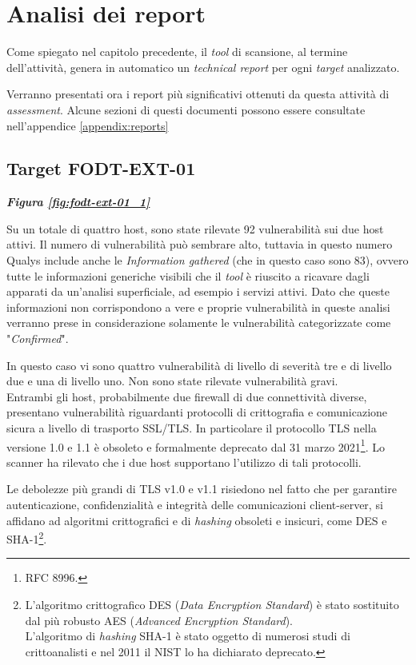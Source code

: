 \documentclass[target=bach,aauheader=]{thud}
\begin{document}
\pagebreak

\section{Analisi dei report}
Come spiegato nel capitolo precedente, il \textit{tool} di scansione, al termine dell'attività, genera in automatico un \textit{technical report} per ogni \textit{target} analizzato.

Verranno presentati ora i report più significativi ottenuti da questa attività di \textit{assessment}.\newline
Alcune sezioni di questi documenti possono essere consultate nell'appendice \ref{appendix:reports}

\subsection{Target FODT-EXT-01} \textbf{\textit{Figura \ref{fig:fodt-ext-01_1}}}

Su un totale di quattro host, sono state rilevate 92 vulnerabilità sui due host attivi. Il numero di vulnerabilità può sembrare alto, tuttavia in questo numero Qualys include anche le \textit{Information gathered} (che in questo caso sono 83), ovvero tutte le informazioni generiche visibili che il \textit{tool} è riuscito a ricavare dagli apparati da un'analisi superficiale, ad esempio i servizi attivi. Dato che queste informazioni non corrispondono a vere e proprie vulnerabilità in queste analisi verranno prese in considerazione solamente le vulnerabilità categorizzate come "\textit{Confirmed}".

In questo caso vi sono quattro vulnerabilità di livello di severità tre e di livello due e una di livello uno. Non sono state rilevate vulnerabilità gravi.
\\ Entrambi gli host, probabilmente due firewall di due connettività diverse, presentano vulnerabilità riguardanti protocolli di crittografia e comunicazione sicura a livello di trasporto SSL/TLS. In particolare il protocollo TLS nella versione 1.0 e 1.1 è obsoleto e formalmente deprecato dal 31 marzo 2021\footnote{RFC 8996.}. Lo scanner ha rilevato che i due host supportano l'utilizzo di tali protocolli.

Le debolezze più grandi di TLS v1.0 e v1.1 risiedono nel fatto che per garantire autenticazione, confidenzialità e integrità delle comunicazioni client-server, si affidano ad algoritmi crittografici e di \textit{hashing} obsoleti e insicuri, come DES e SHA-1\footnote{L'algoritmo crittografico DES (\textit{Data Encryption Standard}) è stato sostituito dal più robusto AES (\textit{Advanced Encryption Standard}).
\\ L'algoritmo di \textit{hashing} SHA-1 è stato oggetto di numerosi studi di crittoanalisti e nel 2011 il NIST lo ha dichiarato deprecato.}.
\end{document}
